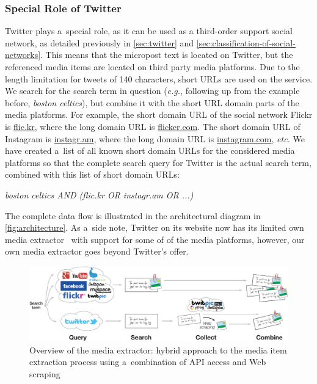 \subsubsection{Special Role of Twitter}

Twitter plays a~special role, as it can be used as
a third-order support social network,
as detailed previously in
\autoref{sec:twitter}
and \autoref{sec:classification-of-social-networks}.
This means that the micropost text is located on Twitter,
but the referenced media items are located
on third party media platforms.
Due to the length limitation for tweets of 140 characters,
short URLs are used on the service.
We search for the search term in question (\emph{e.g.},
following up from the example before, \emph{boston celtics}),
but combine it with the short URL domain parts of
the media platforms.
For example, the short domain URL of the social network Flickr
is \url{flic.kr}, where the long domain URL is \url{flicker.com}.
The short domain URL of Instagram is \url{instagr.am},
where the long domain URL is \url{instagram.com}, \emph{etc.}
We have created a~list of all known short domain URLs for the 
considered media platforms so that the complete search query
for Twitter is the actual search term,
combined with this list of short domain URLs:

\emph{boston celtics AND (flic.kr OR instagr.am OR ...)}

\noindent The complete data flow is illustrated in the
architectural diagram in \autoref{fig:architecture}.
As a~side note, Twitter on its website now has its limited own
media extractor~\cite{wang2012twitter}
with support for some of of the media platforms,
however, our own media extractor goes beyond Twitter's offer.

\begin{figure}
  \centering
  \includegraphics[width=1.0\linewidth]{architecture.pdf}
  \caption{Overview of the media extractor:
    hybrid approach to the media item extraction process using
    a~combination of API access and Web scraping}
  \label{fig:architecture}
\end{figure}

